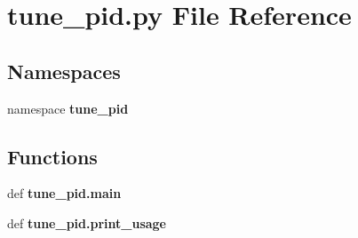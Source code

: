\section{tune\-\_\-pid.\-py \-File \-Reference}
\label{tune__pid_8py}
\subsection*{\-Namespaces}
\begin{DoxyCompactItemize}
\item 
namespace {\bf tune\-\_\-pid}
\end{DoxyCompactItemize}
\subsection*{\-Functions}
\begin{DoxyCompactItemize}
\item 
def {\bf tune\-\_\-pid.\-main}
\item 
def {\bf tune\-\_\-pid.\-print\-\_\-usage}
\end{DoxyCompactItemize}
